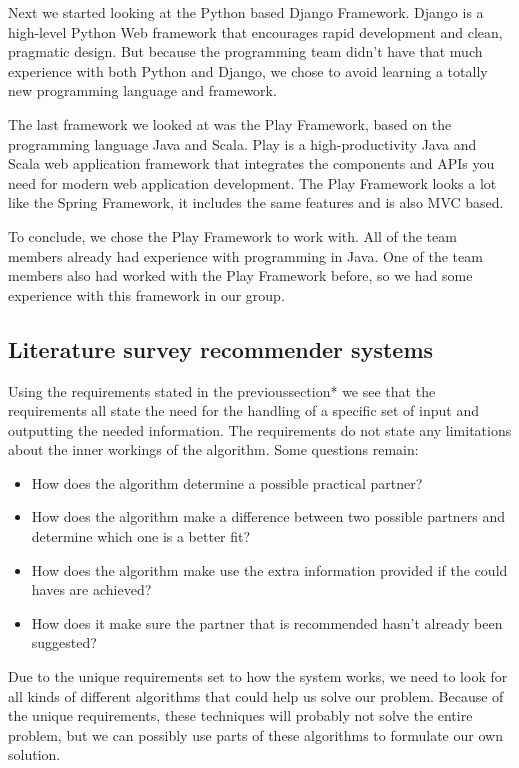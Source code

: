 Next we started looking at the Python based Django Framework\cite{django}.
Django is a high-level Python Web framework that encourages rapid development and clean, pragmatic design.
But because the programming team didn't have that much experience with both Python and Django, we chose to avoid learning a totally new programming language and framework.

The last framework we looked at was the Play Framework\cite{play}, based on the programming language Java and Scala.
Play is a high-productivity Java and Scala web application framework that integrates the components and APIs you need for modern web application development.
The Play Framework looks a lot like the Spring Framework, it includes the same features and is also MVC based.

To conclude, we chose the Play Framework to work with. All of the team members already had experience with programming in Java. One of the team members also had worked with the Play Framework before, so we had some experience with this framework in our group.

\subsection*{Literature survey recommender systems}
Using the requirements stated in the previoussection* we see that the requirements all state the need for the handling of a specific set of input and outputting the needed information.
The requirements do not state any limitations about the inner workings of the algorithm.
Some questions remain:
\begin{itemize}
\item How does the algorithm determine a possible practical partner?
\item How does the algorithm make a difference between two possible partners and determine which one is a better fit?
\item How does the algorithm make use the extra information provided if the could haves are achieved?
\item How does it make sure the partner that is recommended hasn't already been suggested?
\end{itemize}
Due to the unique requirements set to how the system works, we need to look for all kinds of different algorithms that could help us solve our problem.
Because of the unique requirements, these techniques will probably not solve the entire problem, but we can possibly use parts of these algorithms to formulate our own solution.


